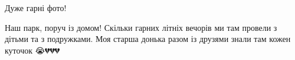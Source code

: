  
 
 
 
 

\qqSecCmt


Дуже гарні фото!


Наш парк, поруч із домом! Скільки гарних літніх вечорів ми там провели з дітьми
та з подружками. Моя старша донька разом із друзями знали там кожен куточок
😭💔💔💔
